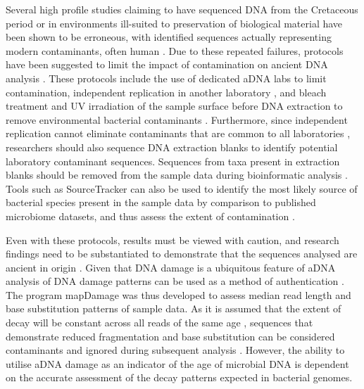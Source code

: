 \documentclass[12pt, a4paper]{article}
\begin{document}
Several high profile studies claiming to have sequenced DNA from the Cretaceous period \cite{Woodward:1994aa} or in environments ill-suited to preservation of biological material \cite{Paabo:1985aa} have been shown to be erroneous, with identified sequences actually representing modern contaminants, often human \cite{Cooper:2000aa,Paabo:aa,Rizzi:2012aa}. 
Due to these repeated failures, protocols have been suggested to limit the impact of contamination on ancient DNA analysis \cite{Weyrich:2015aa,Cooper:2000aa}. 
These protocols include the use of dedicated aDNA labs to limit contamination, independent replication in another laboratory \cite{Cooper:2000aa}, and bleach treatment and UV irradiation of the sample surface before DNA extraction to remove environmental bacterial contaminants .
Furthermore, since independent replication cannot eliminate contaminants that are common to all laboratories \cite{Garcia-Garcera:2011aa}, researchers should also sequence DNA extraction blanks to identify potential laboratory contaminant sequences. Sequences from taxa present in extraction blanks should be removed from the sample data during bioinformatic analysis . 
Tools such as SourceTracker \cite{Knights:2011aa} can also be used to identify the most likely source of bacterial species present in the sample data by comparison to published microbiome datasets, and thus assess the extent of contamination . 

Even with these protocols, results must be viewed with caution, and research findings need to be substantiated to demonstrate that the sequences analysed are ancient in origin \cite{Eisenhofer:2016aa}. 
Given that DNA damage is a ubiquitous feature of aDNA \cite{Briggs:2010aa,Sawyer:2012aa} analysis of DNA damage patterns can be used as a method of authentication  \cite{Poinar:2006aa,Zaremba-Niedzwiedzka:2013aa}. 
The program mapDamage \cite{Ginolhac:2011aa} was thus developed to assess median read length and base substitution patterns of sample data.
As it is assumed that the extent of decay will be constant across all reads of the same age \cite{Zaremba-Niedzwiedzka:2013aa}, sequences that demonstrate reduced fragmentation and base substitution can be considered contaminants and ignored during subsequent analysis \cite{Lugli:2017aa}.
However, the ability to utilise aDNA damage as an indicator of the age of microbial DNA is dependent on the accurate assessment of the decay patterns expected in bacterial genomes.
\end{document}
